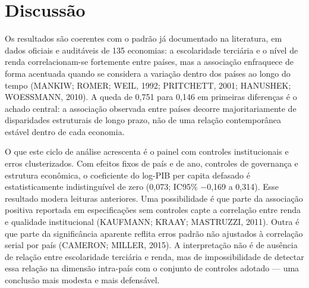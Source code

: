 \documentclass[12pt,a4paper]{article}
\begin{document}
\begin{table}[htbp]
\centering
\caption{Limites de detecção e teste de equivalência (TOST) do coeficiente de painel}
\label{tab:tost}
\small
{}
\par{}
\end{table}

\section{Discussão}

Os resultados são coerentes com o padrão já documentado na literatura, em dados oficiais e auditáveis de 135 economias: a escolaridade terciária e o nível de renda correlacionam-se fortemente entre países, mas a associação enfraquece de forma acentuada quando se considera a variação dentro dos países ao longo do tempo (MANKIW; ROMER; WEIL, 1992; PRITCHETT, 2001; HANUSHEK; WOESSMANN, 2010). A queda de 0,751 para 0,146 em primeiras diferenças é o achado central: a associação observada entre países decorre majoritariamente de disparidades estruturais de longo prazo, não de uma relação contemporânea estável dentro de cada economia.

O que este ciclo de análise acrescenta é o painel com controles institucionais e erros clusterizados. Com efeitos fixos de país e de ano, controles de governança e estrutura econômica, o coeficiente do log-PIB per capita defasado é estatisticamente indistinguível de zero (0,073; IC95\% $-$0,169 a 0,314). Esse resultado modera leituras anteriores. Uma possibilidade é que parte da associação positiva reportada em especificações sem controles capte a correlação entre renda e qualidade institucional (KAUFMANN; KRAAY; MASTRUZZI, 2011). Outra é que parte da significância aparente reflita erros padrão não ajustados à correlação serial por país (CAMERON; MILLER, 2015). A interpretação não é de ausência de relação entre escolaridade terciária e renda, mas de impossibilidade de detectar essa relação na dimensão intra-país com o conjunto de controles adotado --- uma conclusão mais modesta e mais defensável.
\end{document}
